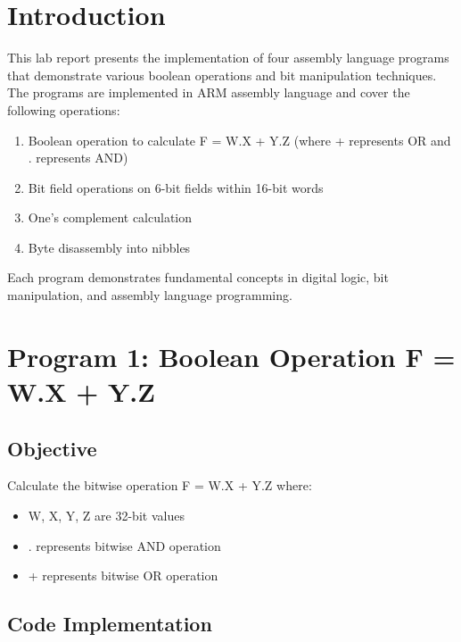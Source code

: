 \documentclass[12pt,a4paper]{article}
\begin{document}
\section{Introduction}

This lab report presents the implementation of four assembly language programs that demonstrate various boolean operations and bit manipulation techniques. The programs are implemented in ARM assembly language and cover the following operations:

\begin{enumerate}
    \item Boolean operation to calculate F = W.X + Y.Z (where + represents OR and . represents AND)
    \item Bit field operations on 6-bit fields within 16-bit words
    \item One's complement calculation
    \item Byte disassembly into nibbles
\end{enumerate}

Each program demonstrates fundamental concepts in digital logic, bit manipulation, and assembly language programming.

\newpage
\section{Program 1: Boolean Operation F = W.X + Y.Z}

\subsection{Objective}
Calculate the bitwise operation F = W.X + Y.Z where:
\begin{itemize}
    \item W, X, Y, Z are 32-bit values
    \item . represents bitwise AND operation
    \item + represents bitwise OR operation
\end{itemize}

\subsection{Code Implementation}
\end{document}
